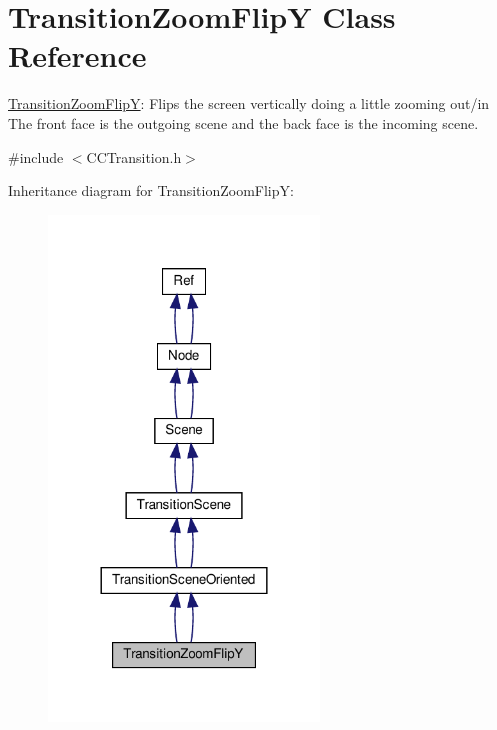 \hypertarget{classTransitionZoomFlipY}{}\section{Transition\+Zoom\+FlipY Class Reference}
\label{classTransitionZoomFlipY}


\hyperlink{classTransitionZoomFlipY}{Transition\+Zoom\+FlipY}\+: Flips the screen vertically doing a little zooming out/in The front face is the outgoing scene and the back face is the incoming scene.  




{\ttfamily \#include $<$C\+C\+Transition.\+h$>$}



Inheritance diagram for Transition\+Zoom\+FlipY\+:
\nopagebreak
\begin{figure}[H]
\begin{center}
\leavevmode
\includegraphics[width=204pt]{classTransitionZoomFlipY__inherit__graph}
\end{center}
\end{figure}


